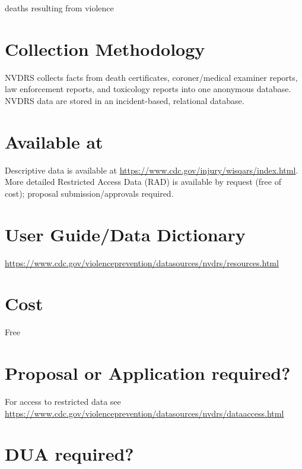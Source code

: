 \documentclass[
]{book}
\begin{document}
deaths resulting from violence

\hypertarget{collection-methodology-65}{%
\section{Collection Methodology}\label{collection-methodology-65}}

NVDRS collects facts from death certificates, coroner/medical examiner reports, law enforcement reports, and toxicology reports into one anonymous database. NVDRS data are stored in an incident-based, relational database.

\hypertarget{available-at-65}{%
\section{Available at}\label{available-at-65}}

Descriptive data is available at \url{https://www.cdc.gov/injury/wisqars/index.html}. More detailed Restricted Access Data (RAD) is available by request (free of cost); proposal submission/approvals required.

\hypertarget{user-guidedata-dictionary-65}{%
\section{User Guide/Data Dictionary}\label{user-guidedata-dictionary-65}}

\url{https://www.cdc.gov/violenceprevention/datasources/nvdrs/resources.html}

\hypertarget{cost-65}{%
\section{Cost}\label{cost-65}}

Free

\hypertarget{proposal-or-application-required-65}{%
\section{Proposal or Application required?}\label{proposal-or-application-required-65}}

For access to restricted data see \url{https://www.cdc.gov/violenceprevention/datasources/nvdrs/dataaccess.html}

\hypertarget{dua-required-65}{%
\section{DUA required?}\label{dua-required-65}}
\end{document}

